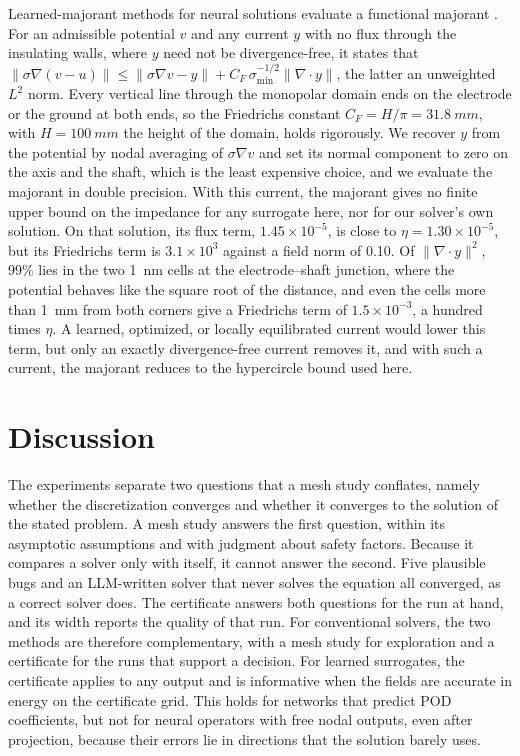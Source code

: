 \documentclass[11pt]{article}
\begin{document}
Learned-majorant methods for neural solutions \cite{fanaskov2024,fanaskov2026}
evaluate a functional majorant \cite{repin2008}. For an admissible potential $v$ and
any current $y$ with no flux through the insulating walls, where $y$ need not be
divergence-free, it states that
$\lVert\sigma\nabla(v-u)\rVert\le\lVert\sigma\nabla v-y\rVert+C_F\,\sigma_{\min}^{-1/2}\lVert\nabla\cdot y\rVert$,
the latter an unweighted $L^2$ norm.
Every vertical line through the monopolar domain ends on the electrode or the ground
at both ends, so the Friedrichs constant
$C_F=H/\pi=\SI{31.8}{mm}$, with $H=\SI{100}{mm}$ the height of the domain, holds
rigorously. We recover $y$ from
the potential by nodal averaging of $\sigma\nabla v$ and set its normal component to
zero on the axis and the shaft, which is the least expensive choice, and we
evaluate the majorant in double precision. With this current, the majorant gives no
finite upper bound on the impedance for any surrogate here, nor for our solver's own
solution. On that solution, its flux term, $1.45\times10^{-5}$, is close to
$\eta=1.30\times10^{-5}$, but its Friedrichs term is $3.1\times10^3$ against a field
norm of 0.10. Of $\lVert\nabla\cdot y\rVert^2$, 99\% lies in the two \SI{1}{nm}
cells at the electrode--shaft junction, where the potential behaves like the square
root of the distance, and even the cells more than \SI{1}{mm} from both corners give
a Friedrichs term of $1.5\times10^{-3}$, a hundred times $\eta$. A learned,
optimized, or locally equilibrated current \cite{braess2009} would lower this term,
but only an exactly divergence-free current removes it, and with such a current, the
majorant reduces to the hypercircle bound used here.

\section{Discussion}\label{sec:discussion}

The experiments separate two questions that a mesh study conflates, namely
whether the discretization converges and whether it converges to the solution of the
stated problem. A mesh study answers the first question, within its asymptotic
assumptions and with judgment about safety factors. Because it compares a solver only
with itself, it cannot answer the second. Five plausible bugs and an LLM-written
solver that never solves the equation all converged, as a correct solver does. The
certificate answers both questions for the run at hand, and its width reports the
quality of that run. For conventional solvers, the two methods are therefore
complementary, with a mesh study for exploration and a certificate for the runs that
support a decision. For learned surrogates, the certificate applies to any output and
is informative when the fields are accurate in energy on the certificate grid. This
holds for networks that predict POD coefficients, but not for neural operators with
free nodal outputs, even after projection, because their errors lie in directions
that the solution barely uses.
\end{document}
